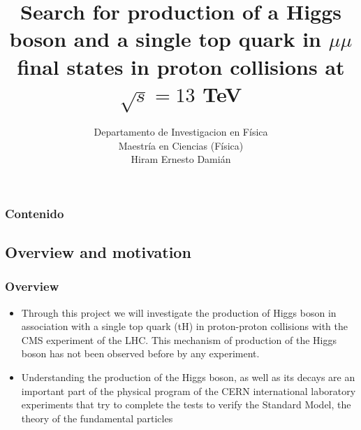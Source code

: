 \documentclass[11pt]{beamer}
\begin{document}
	\author{
		Departamento de Investigacion en F\'isica \\
		Maestr\'ia en Ciencias (F\'isica)\\
		Hiram Ernesto Dami\'an}
	\title{Search for production of a Higgs boson and a single top quark in $\mu\mu$ final states in proton collisions at $\sqrt{s}=13$ TeV}
	\newcommand{\subf}[2]{%
		{\small\begin{tabular}[t]{@{}c@{}}
				#1\\#2
		\end{tabular}}%
	}
	\begin{frame}
	\titlepage
\end{frame}

\begin{frame}
\tableofcontents
\frametitle{Contenido}
\end{frame}


\begin{frame}
\section{Overview and motivation}
\frametitle{Overview}
\begin{itemize}
\item Through this project we will investigate the production of Higgs boson in association with a
single top quark (tH) in proton-proton collisions with the CMS experiment of the LHC. This
mechanism of production of the Higgs boson has not been observed before by any
experiment.

\item Understanding the production of the Higgs boson, as well as its decays are an important part
of the physical program of the CERN international laboratory experiments that try to complete
the tests to verify the Standard Model, the theory of the fundamental particles

\end{itemize}
\end{frame}
\end{document}
